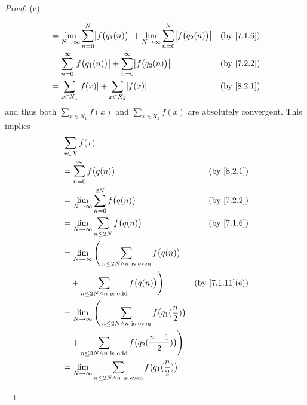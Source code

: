 \begin{proof}{(c)}
\begin{itemize}
\begin{align*}
             & = \lim_{N \to \infty} \sum_{n = 0}^N \abs{f\big(q_1(n)\big)} + \lim_{N \to \infty} \sum_{n = 0}^N \abs{f\big(q_2(n)\big)} & \text{(by \cref{7.1.6})}     \\
             & = \sum_{n = 0}^\infty \abs{f\big(q_1(n)\big)} + \sum_{n = 0}^\infty \abs{f\big(q_2(n)\big)}                               & \text{(by \cref{7.2.2})}     \\
             & = \sum_{x \in X_1} \abs{f(x)} + \sum_{x \in X_2} \abs{f(x)}                                                               & \text{(by \cref{8.2.1})}
          \end{align*}
          and thus both \(\sum_{x \in X_1} f(x)\) and \(\sum_{x \in X_2} f(x)\) are absolutely convergent.
          This implies
          \begin{align*}
             & \sum_{x \in X} f(x)                                                                                                                          \\
             & = \sum_{n = 0}^\infty f\big(q(n)\big)                                                                         & \text{(by \cref{8.2.1})}     \\
             & = \lim_{N \to \infty} \sum_{n = 0}^{2N} f\big(q(n)\big)                                                       & \text{(by \cref{7.2.2})}     \\
             & = \lim_{N \to \infty} \sum_{n \leq 2N} f\big(q(n)\big)                                                        & \text{(by \cref{7.1.6})}     \\
             & = \lim_{N \to \infty} \Bigg(\sum_{n \leq 2N \land n \text{ is even}} f\big(q(n)\big)                                                         \\
             & \quad + \sum_{n \leq 2N \land n \text{ is odd}} f\big(q(n)\big)\Bigg)                                         & \text{(by \cref{7.1.11}(e))} \\
             & = \lim_{N \to \infty} \Bigg(\sum_{n \leq 2N \land n \text{ is even}} f\big(q_1(\frac{n}{2})\big)                                             \\
             & \quad + \sum_{n \leq 2N \land n \text{ is odd}} f\big(q_2(\frac{n - 1}{2})\big)\Bigg)                                                        \\
             & = \lim_{N \to \infty} \sum_{n \leq 2N \land n \text{ is even}} f\big(q_1(\frac{n}{2})\big)                                                   \\

\end{align*}
\end{itemize}
\end{proof}
